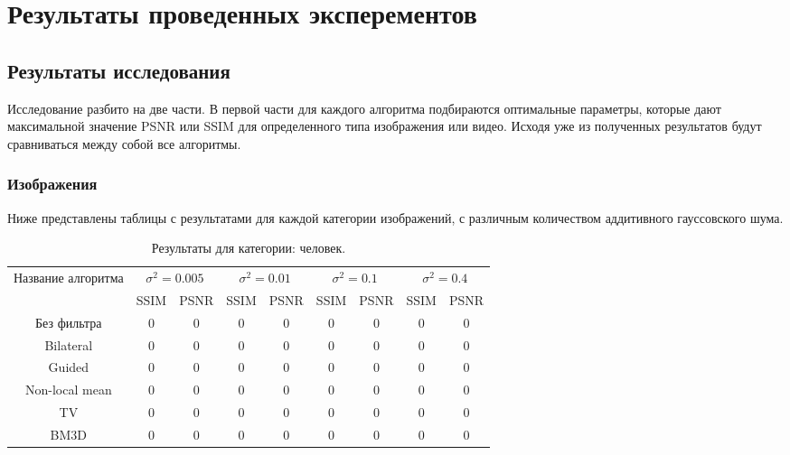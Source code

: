 \section{Результаты проведенных эксперементов}
\subsection{Результаты исследования}
Исследование разбито на две части. В первой части для каждого алгоритма подбираются оптимальные параметры, которые дают максимальной значение PSNR или SSIM для определенного типа изображения или видео. Исходя уже из полученных результатов будут сравниваться между собой все алгоритмы.
\subsubsection{Изображения}
Ниже представлены таблицы с результатами для каждой категории изображений, с различным количеством аддитивного гауссовского шума.
\begin{table}[H]
	\caption{\label{tab:bolts} Результаты для категории: человек.}
\begin{tabular}{|c|c|c|c|c|c|c|c|c|}
	\hline
	Название алгоритма & \multicolumn{2}{|c|}{$\sigma^2=0.005$}  & \multicolumn{2}{|c|}{$\sigma^2=0.01$}& \multicolumn{2}{|c|}{$\sigma^2=0.1$} & \multicolumn{2}{|c|}{$\sigma^2=0.4$} \\
	\cline{2-9}
	 & SSIM  & PSNR & SSIM  & PSNR & SSIM  & PSNR & SSIM  & PSNR\\
		\hline
Без фильтра& 0 & 0& 0 & 0& 0 & 0 & 0 & 0 \\
\hline
	Bilateral& 0 & 0& 0 & 0& 0 & 0 & 0 & 0 \\
	\hline
	Guided & 0 & 0& 0 & 0& 0 & 0 & 0 & 0 \\
	\hline
	Non-local mean & 0 & 0& 0 & 0& 0 & 0 & 0 & 0 \\
	\hline
	TV  & 0 & 0& 0 & 0& 0 & 0 & 0 & 0 \\
	\hline
	BM3D & 0 & 0& 0 & 0& 0 & 0 & 0 & 0 \\
	\hline	
\end{tabular}
\end{table}


